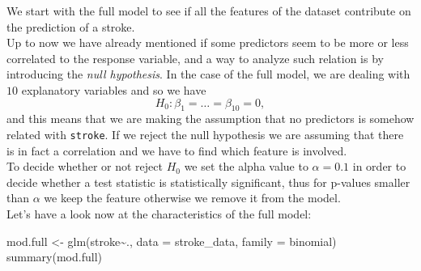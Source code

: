 \documentclass[
]{article}
\newenvironment{Shaded}{\begin{snugshade}}{\end{snugshade}}
\newcommand{\AttributeTok}[1]{\textcolor[rgb]{0.77,0.63,0.00}{#1}}
\newcommand{\FunctionTok}[1]{\textcolor[rgb]{0.00,0.00,0.00}{#1}}
\newcommand{\NormalTok}[1]{#1}
\newcommand{\OtherTok}[1]{\textcolor[rgb]{0.56,0.35,0.01}{#1}}
\newcommand{\SpecialCharTok}[1]{\textcolor[rgb]{0.00,0.00,0.00}{#1}}
\begin{document}
We start with the full model to see if all the features of the dataset
contribute on the prediction of a stroke.\\
Up to now we have already mentioned if some predictors seem to be more
or less correlated to the response variable, and a way to analyze such
relation is by introducing the \emph{null hypothesis}. In the case of
the full model, we are dealing with \(10\) explanatory variables and so
we have \[H_0 : \beta_1 = \dots = \beta_{10} = 0,\] and this means that
we are making the assumption that no predictors is somehow related with
\texttt{stroke}. If we reject the null hypothesis we are assuming that
there is in fact a correlation and we have to find which feature is
involved.\\
To decide whether or not reject \(H_0\) we set the alpha value to
\(\alpha = 0.1\) in order to decide whether a test statistic is
statistically significant, thus for p-values smaller than \(\alpha\) we
keep the feature otherwise we remove it from the model.\\
Let's have a look now at the characteristics of the full model:

\begin{Shaded}
\begin{Highlighting}[]
\NormalTok{mod.full }\OtherTok{\textless{}{-}} \FunctionTok{glm}\NormalTok{(stroke}\SpecialCharTok{\textasciitilde{}}\NormalTok{., }\AttributeTok{data =}\NormalTok{ stroke\_data, }\AttributeTok{family =}\NormalTok{ binomial)}
\FunctionTok{summary}\NormalTok{(mod.full)}
\end{Highlighting}
\end{Shaded}
\end{document}
